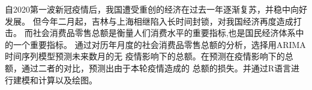 

{\fangsong\xiaosihao
\setlength{\parindent}{2em}
自2020第一波新冠疫情后，我国遭受重创的经济在过去一年逐渐复苏，并稳中向好发展。
但今年二月起，吉林与上海相继陷入长时间封锁，对我国经济再度造成打击。
而社会消费品零售总额是衡量人们消费水平的重要指标,也是国民经济体系中的一个重要指标。
通过对历年月度的社会消费品零售总额的分析，选择用ARIMA时间序列模型预测未来数月的无
疫情影响下的总额。在预测在疫情影响下的总额，通过二者的对比，预测出由于本轮疫情造成的
总额的损失。并通过R语言进行建模和计算以及绘图。
}








